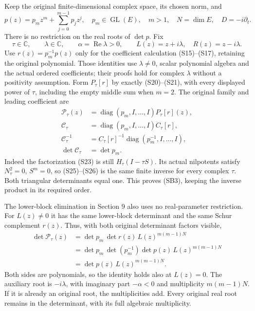 \documentclass[
  11pt,
]{article}
\begin{document}
Keep the original finite-dimensional complex space, its chosen norm, and
\[
 p(z)=p_mz^m+\sum_{j=0}^{m-1}p_jz^j,\quad
 p_m\in\operatorname{GL}(E),\quad m>1,\quad N=\dim E,
 \quad D=-i\partial_t.
 \tag{SB1}
\] There is no restriction on the real roots of \(\det p\). Fix \[
 \tau\in\mathbb C,\qquad \lambda\in\mathbb C,
 \qquad \alpha=\operatorname{Re}\lambda>0,
 \qquad L(z)=z+i\lambda,\quad R(z)=z-i\lambda.
 \tag{SB2}
\] Use \(r(z)=p_m^{-1}p(z)\) only for the coefficient calculation
(S15)--(S17), retaining the original polynomial. Those identities use
\(\lambda\ne0\), scalar polynomial algebra and the actual ordered
coefficients; their proofs hold for complex \(\lambda\) without a
positivity assumption. Form \(P_\tau[r]\) by exactly (S20)--(S21), with
every displayed power of \(\tau\), including the empty middle sum when
\(m=2\). The original family and leading coefficient are \[
 \begin{split}
 \mathcal P_\tau(z)&=\operatorname{diag}(p_m,I,\ldots,I)P_\tau[r](z),\\
 \mathcal C_\tau&=\operatorname{diag}(p_m,I,\ldots,I)C_\tau[r],\\
 \mathcal C_\tau^{-1}&=C_\tau[r]^{-1}
                         \operatorname{diag}(p_m^{-1},I,\ldots,I),\\
 \det\mathcal C_\tau&=\det p_m.
 \end{split}
 \tag{SB3}
\] Indeed the factorization (S23) is still \(H_\tau(I-\tau S)\). Its
actual nilpotents satisfy \(N_\tau^2=0\), \(S^m=0\), so (S25)--(S26) is
the same finite inverse for every complex \(\tau\). Both triangular
determinants equal one. This proves (SB3), keeping the inverse product
in its required order.

The lower-block elimination in Section 9 also uses no real-parameter
restriction. For \(L(z)\ne0\) it has the same lower-block determinant
and the same Schur complement \(r(z)\). Thus, with both original
determinant factors visible, \[
 \begin{split}
 \det\mathcal P_\tau(z)
   &=\det p_m\,\det r(z)\,L(z)^{m(m-1)N}\\
   &=\det p_m\,\det(p_m^{-1})\det p(z)\,
                                  L(z)^{m(m-1)N}\\
   &=\det p(z)\,L(z)^{m(m-1)N}.
 \end{split}
 \tag{SB4}
\] Both sides are polynomials, so the identity holds also at \(L(z)=0\).
The auxiliary root is \(-i\lambda\), with imaginary part \(-\alpha<0\)
and multiplicity \(m(m-1)N\). If it is already an original root, the
multiplicities add. Every original real root remains in the determinant,
with its full algebraic multiplicity.
\end{document}
